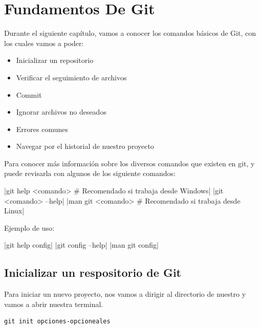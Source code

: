 \section{Fundamentos De Git}

Durante el siguiente capítulo, vamos a conocer los comandos básicos de Git, con los cuales vamos a poder:

\begin{itemize}
	\item Inicializar un repositorio
	\item Verificar el seguimiento de archivos
	\item Commit
	\item Ignorar archivos no deseados
	\item Errores comunes
	\item Navegar por el historial de nuestro proyecto
\end{itemize}

\begin{pucpImportant}
Para conocer más información sobre los diversos comandos que existen en git, y puede revisarla con algunos de los siguiente comandos:

	\begin{gitCode}
		|git help <comando> # Recomendado si trabaja desde Windows|
		|git <comando> --help|
		|man git <comando>  # Recomendado si trabaja desde Linux|	
	\end{gitCode}

Ejemplo de uso:

	\begin{terminal}
		|git help config|
		|git config --help|
		|man git config|
	\end{terminal}

\end{pucpImportant}

\subsection{Inicializar un respositorio de Git}

Para iniciar un nuevo proyecto, nos vamos a dirigir al directorio de nuestro y vamos a abrir nuestra terminal.

\begin{gitCode}
\begin{verbatim}
git init opciones-opcioneales
\end{verbatim}
\end{gitCode}

